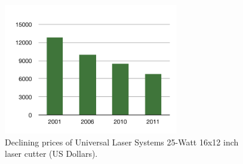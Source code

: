 %

\begin{figure}[b] %
   \centering
   \includegraphics[width=3in]{img/prices.pdf} 
   \caption[Declining laser cutter prices]{Declining prices of Universal Laser Systems 25-Watt 16x12
     inch laser cutter (US Dollars).}
   \label{fig:prices}
\end{figure}
